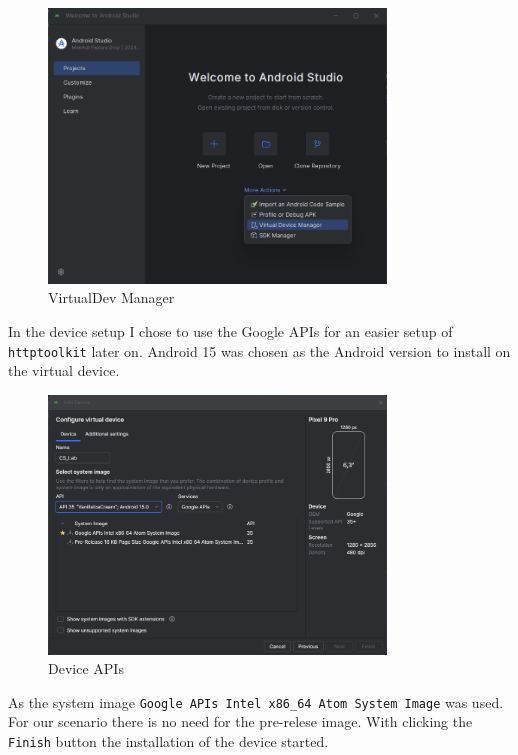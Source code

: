 \documentclass[12pt,a4paper]{article}
\begin{document}
\begin{figure}[H]
\centering
\includegraphics[width=0.8\textwidth]{./screenshots/android_virtual_dev_manager.png}
\caption{VirtualDev Manager}
\end{figure}

In the device setup I chose to use the Google APIs for an easier setup of \texttt{httptoolkit} later on. Android 15 was chosen as the Android version to install on the virtual device.

\begin{figure}[H]
\centering
\includegraphics[width=0.8\textwidth]{./screenshots/dev_apis.png}
\caption{Device APIs}
\end{figure}

As the system image \texttt{Google APIs Intel x86\_64 Atom System Image} was used. For our scenario there is no need for the pre-relese image.
With clicking the \texttt{Finish} button the installation of the device started.
\end{document}
